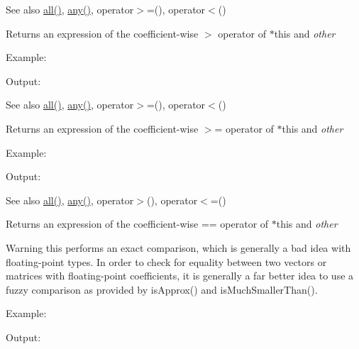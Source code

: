 \begin{DoxySeeAlso}{See also}
\mbox{\hyperlink{class_eigen_1_1_dense_base_ae42ab60296c120e9f45ce3b44e1761a4}{all()}}, \mbox{\hyperlink{class_eigen_1_1_dense_base_abfbf4cb72dd577e62fbe035b1c53e695}{any()}}, operator$>$=(), operator$<$()
\end{DoxySeeAlso}
\begin{DoxyReturn}{Returns}
an expression of the coefficient-\/wise $>$ operator of $\ast$this and {\itshape other} 
\end{DoxyReturn}
Example\+: 
\begin{DoxyCodeInclude}{0}
\end{DoxyCodeInclude}
 Output\+: 
\begin{DoxyVerbInclude}
\end{DoxyVerbInclude}


\begin{DoxySeeAlso}{See also}
\mbox{\hyperlink{class_eigen_1_1_dense_base_ae42ab60296c120e9f45ce3b44e1761a4}{all()}}, \mbox{\hyperlink{class_eigen_1_1_dense_base_abfbf4cb72dd577e62fbe035b1c53e695}{any()}}, operator$>$=(), operator$<$()
\end{DoxySeeAlso}
\begin{DoxyReturn}{Returns}
an expression of the coefficient-\/wise $>$= operator of $\ast$this and {\itshape other} 
\end{DoxyReturn}
Example\+: 
\begin{DoxyCodeInclude}{0}
\end{DoxyCodeInclude}
 Output\+: 
\begin{DoxyVerbInclude}
\end{DoxyVerbInclude}


\begin{DoxySeeAlso}{See also}
\mbox{\hyperlink{class_eigen_1_1_dense_base_ae42ab60296c120e9f45ce3b44e1761a4}{all()}}, \mbox{\hyperlink{class_eigen_1_1_dense_base_abfbf4cb72dd577e62fbe035b1c53e695}{any()}}, operator$>$(), operator$<$=()
\end{DoxySeeAlso}
\begin{DoxyReturn}{Returns}
an expression of the coefficient-\/wise == operator of $\ast$this and {\itshape other} 
\end{DoxyReturn}
\begin{DoxyWarning}{Warning}
this performs an exact comparison, which is generally a bad idea with floating-\/point types. In order to check for equality between two vectors or matrices with floating-\/point coefficients, it is generally a far better idea to use a fuzzy comparison as provided by is\+Approx() and is\+Much\+Smaller\+Than().
\end{DoxyWarning}
Example\+: 
\begin{DoxyCodeInclude}{0}
\end{DoxyCodeInclude}
 Output\+: 
\begin{DoxyVerbInclude}
\end{DoxyVerbInclude}


